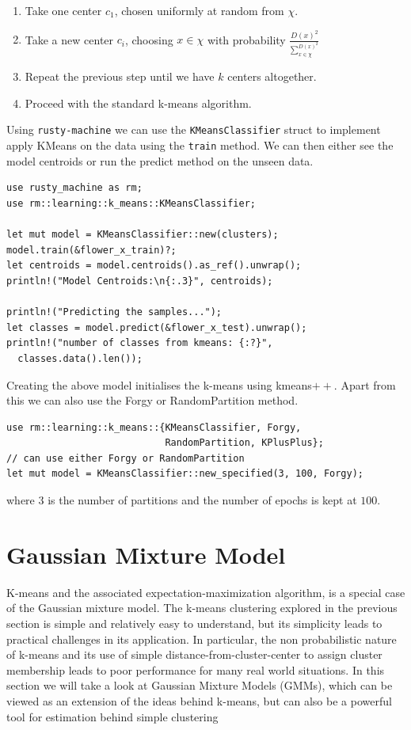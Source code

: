 \documentclass{book}
\begin{document}
\begin{enumerate}
	\item Take one center $c_1$, chosen uniformly at random from $\chi$.
	\item Take a new center $c_i$, choosing $x \in \chi$ with probability $\frac{D(x)^2}{\sum_{x \in \chi}^{D(x)^2}}$
	\item Repeat the previous step until we have $k$ centers altogether.
	\item Proceed with the standard k-means algorithm.
\end{enumerate}

Using \lstinline{rusty-machine} we can use the \lstinline{KMeansClassifier} struct to implement apply KMeans on the data using the \lstinline{train} method. We can then either see the model centroids or run the predict method on the unseen data.

\begin{lstlisting}[caption={rusty\_machine\_unsupervised}]
use rusty_machine as rm;
use rm::learning::k_means::KMeansClassifier;

let mut model = KMeansClassifier::new(clusters);
model.train(&flower_x_train)?;
let centroids = model.centroids().as_ref().unwrap();
println!("Model Centroids:\n{:.3}", centroids);

println!("Predicting the samples...");
let classes = model.predict(&flower_x_test).unwrap();
println!("number of classes from kmeans: {:?}",
  classes.data().len());
\end{lstlisting}

Creating the above model initialises the k-means using kmeans$++$. Apart from this we can also use the Forgy or RandomPartition method.

\begin{lstlisting}[caption={rusty\_machine\_unsupervised}]
use rm::learning::k_means::{KMeansClassifier, Forgy,
                            RandomPartition, KPlusPlus};
// can use either Forgy or RandomPartition
let mut model = KMeansClassifier::new_specified(3, 100, Forgy);
\end{lstlisting}

where $3$ is the number of partitions and the number of epochs is kept at $100$.

\label{sec:kmeans_clustering}
\section{Gaussian Mixture Model}%
K-means and the associated expectation-maximization algorithm, is a special case of the Gaussian mixture model. The k-means clustering explored in the previous section is simple and relatively easy to understand, but its simplicity leads to practical challenges in its application. In particular, the non probabilistic nature of k-means and its use of simple distance-from-cluster-center to assign cluster membership leads to poor performance for many real world situations. In this section we will take a look at Gaussian Mixture Models (GMMs), which can be viewed as an extension of the ideas behind k-means, but can also be a powerful tool for estimation behind simple clustering \cite{UL:7} 
\end{document}
